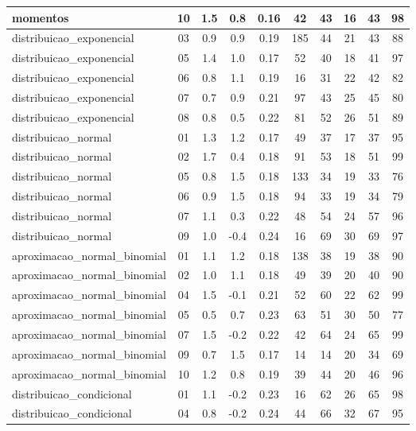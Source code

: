 \documentclass[a4paper]{report}
\begin{document}
\begin{longtable}{l|c|c|c|c|c|c|c|c|c}
\hline
momentos & 10 & 1.5 & 0.8 & 0.16 & 42 & 43 & 16 & 43 & 98\\
\hline
distribuicao\_exponencial & 03 & 0.9 & 0.9 & 0.19 & 185 & 44 & 21 & 43 & 88\\
\hline
distribuicao\_exponencial & 05 & 1.4 & 1.0 & 0.17 & 52 & 40 & 18 & 41 & 97\\
\hline
distribuicao\_exponencial & 06 & 0.8 & 1.1 & 0.19 & 16 & 31 & 22 & 42 & 82\\
\hline
distribuicao\_exponencial & 07 & 0.7 & 0.9 & 0.21 & 97 & 43 & 25 & 45 & 80\\
\hline
distribuicao\_exponencial & 08 & 0.8 & 0.5 & 0.22 & 81 & 52 & 26 & 51 & 89\\
\hline
distribuicao\_normal & 01 & 1.3 & 1.2 & 0.17 & 49 & 37 & 17 & 37 & 95\\
\hline
distribuicao\_normal & 02 & 1.7 & 0.4 & 0.18 & 91 & 53 & 18 & 51 & 99\\
\hline
distribuicao\_normal & 05 & 0.8 & 1.5 & 0.18 & 133 & 34 & 19 & 33 & 76\\
\hline
distribuicao\_normal & 06 & 0.9 & 1.5 & 0.18 & 94 & 33 & 19 & 34 & 79\\
\hline
distribuicao\_normal & 07 & 1.1 & 0.3 & 0.22 & 48 & 54 & 24 & 57 & 96\\
\hline
distribuicao\_normal & 09 & 1.0 & -0.4 & 0.24 & 16 & 69 & 30 & 69 & 97\\
\hline
aproximacao\_normal\_binomial & 01 & 1.1 & 1.2 & 0.18 & 138 & 38 & 19 & 38 & 90\\
\hline
aproximacao\_normal\_binomial & 02 & 1.0 & 1.1 & 0.18 & 49 & 39 & 20 & 40 & 90\\
\hline
aproximacao\_normal\_binomial & 04 & 1.5 & -0.1 & 0.21 & 52 & 60 & 22 & 62 & 99\\
\hline
aproximacao\_normal\_binomial & 05 & 0.5 & 0.7 & 0.23 & 63 & 51 & 30 & 50 & 77\\
\hline
aproximacao\_normal\_binomial & 07 & 1.5 & -0.2 & 0.22 & 42 & 64 & 24 & 65 & 99\\
\hline
aproximacao\_normal\_binomial & 09 & 0.7 & 1.5 & 0.17 & 14 & 14 & 20 & 34 & 69\\
\hline
aproximacao\_normal\_binomial & 10 & 1.2 & 0.8 & 0.19 & 39 & 44 & 20 & 46 & 96\\
\hline
distribuicao\_condicional & 01 & 1.1 & -0.2 & 0.23 & 16 & 62 & 26 & 65 & 98\\
\hline
distribuicao\_condicional & 04 & 0.8 & -0.2 & 0.24 & 44 & 66 & 32 & 67 & 95\\
\hline

\end{longtable}
\end{document}
